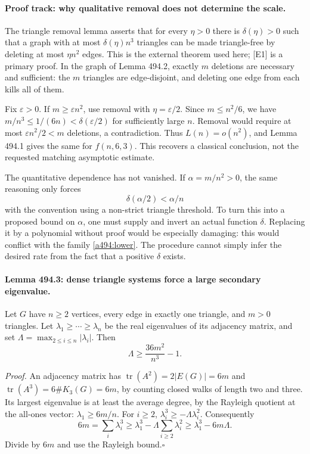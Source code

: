 \documentclass[11pt]{article}
\begin{document}
\paragraph{Proof track: why qualitative removal does not determine the scale.}
The triangle removal lemma asserts that for every $\eta>0$ there is
$\delta(\eta)>0$ such that a graph with at most $\delta(\eta)n^3$
triangles can be made triangle-free by deleting at most $\eta n^2$ edges.
This is the external theorem used here; [E1] is a primary proof. In the
graph of Lemma 494.2, exactly $m$ deletions are necessary and sufficient:
the $m$ triangles are edge-disjoint, and deleting one edge from each kills
all of them.

Fix $\varepsilon>0$. If $m\geq\varepsilon n^2$, use removal with
$\eta=\varepsilon/2$. Since $m\leq n^2/6$, we have
$m/n^3\leq1/(6n)<\delta(\varepsilon/2)$ for sufficiently large $n$.
Removal would require at most $\varepsilon n^2/2<m$ deletions, a
contradiction. Thus $L(n)=o(n^2)$, and Lemma 494.1 gives the same for
$f(n,6,3)$. This recovers a classical conclusion, not the requested
matching asymptotic estimate.

The quantitative dependence has not vanished. If $\alpha=m/n^2>0$, the
same reasoning only forces
\[
                      \delta(\alpha/2)<\alpha/n
\]
with the convention using a non-strict triangle threshold. To turn this
into a proposed bound on $\alpha$, one must supply and invert an actual
function $\delta$. Replacing it by a polynomial without proof would be
especially damaging: this would conflict with the family
\eqref{a494:lower}. The procedure cannot simply infer the desired rate
from the fact that a positive $\delta$ exists.

\paragraph{Lemma 494.3: dense triangle systems force a large secondary eigenvalue.}
Let $G$ have $n\geq2$ vertices, every edge in exactly one triangle, and
$m>0$ triangles. Let $\lambda_1\geq\cdots\geq\lambda_n$ be the real
eigenvalues of its adjacency matrix, and set
$\Lambda=\max_{2\leq i\leq n}|\lambda_i|$. Then
\begin{equation}\label{a494:spectral}
                  \Lambda\geq\frac{36m^2}{n^3}-1.
\end{equation}

\emph{Proof.} An adjacency matrix has
$\operatorname{tr}(A^2)=2|E(G)|=6m$ and
$\operatorname{tr}(A^3)=6\#K_3(G)=6m$, by counting closed walks of
length two and three. Its largest eigenvalue is at least the average
degree, by the Rayleigh quotient at the all-ones vector:
$\lambda_1\geq6m/n$. For $i\geq2$,
$\lambda_i^3\geq-\Lambda\lambda_i^2$. Consequently
\[
 6m=\sum_i\lambda_i^3
      \geq\lambda_1^3-\Lambda\sum_{i\geq2}\lambda_i^2
      \geq\lambda_1^3-6m\Lambda.
\]
Divide by $6m$ and use the Rayleigh bound.\hfill$\square$
\end{document}
